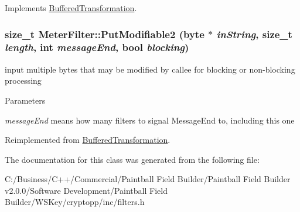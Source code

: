 Implements \hyperlink{class_buffered_transformation_ad396dcb42260f23125a35ec0e5d17d55}{BufferedTransformation}.\hypertarget{class_meter_filter_a03c8af7442aa844e83e4c45397373f14}{
\subsubsection[{PutModifiable2}]{\setlength{\rightskip}{0pt plus 5cm}size\_\-t MeterFilter::PutModifiable2 (byte $\ast$ {\em inString}, \/  size\_\-t {\em length}, \/  int {\em messageEnd}, \/  bool {\em blocking})}}
\label{class_meter_filter_a03c8af7442aa844e83e4c45397373f14}


input multiple bytes that may be modified by callee for blocking or non-\/blocking processing 
\begin{DoxyParams}{Parameters}
\item[{\em messageEnd}]means how many filters to signal MessageEnd to, including this one \end{DoxyParams}


Reimplemented from \hyperlink{class_buffered_transformation_a770bf11f26d4dec66423a7dc2d36843d}{BufferedTransformation}.

The documentation for this class was generated from the following file:\begin{DoxyCompactItemize}
\item 
C:/Business/C++/Commercial/Paintball Field Builder/Paintball Field Builder v2.0.0/Software Development/Paintball Field Builder/WSKey/cryptopp/inc/filters.h\end{DoxyCompactItemize}
